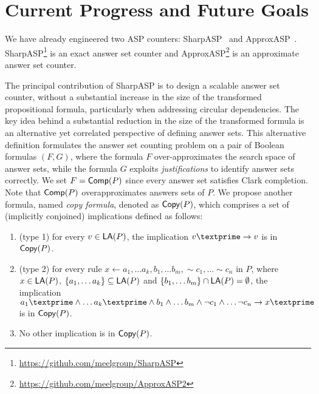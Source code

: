 \section{Current Progress and Future Goals}
We have already engineered two ASP counters: SharpASP~\cite{KCM2024} and ApproxASP~\cite{KESHFM2022}. 
SharpASP\footnote{\url{https://github.com/meelgroup/SharpASP}} is an exact answer set counter and ApproxASP\footnote{\url{https://github.com/meelgroup/ApproxASP2}} is an approximate answer set counter. 

The principal contribution of SharpASP is to design a scalable answer set counter, without a substantial increase in the size of the transformed propositional formula, particularly when addressing circular dependencies. The key idea behind a substantial reduction in the size of the transformed formula is an alternative yet correlated perspective of defining answer sets. This alternative definition formulates the answer set counting problem on a pair of Boolean formulas $(F, G)$, where the formula $F$ over-approximates the search space of answer sets, while the formula $G$ exploits {\em justifications} to identify answer sets correctly. We set $F = \mathsf{Comp}(P)$ since every answer set satisfies Clark completion. Note that $\mathsf{Comp}(P)$ overapproximates answers sets of $P$. We propose another formula, named {\em copy formula}, denoted as $\mathsf{Copy}(P)$, which comprises a set of (implicitly conjoined) implications defined as follows:
\begin{enumerate}
\item \label{l1:type1} (type 1) for every $v \in \mathsf{LA}(P)$, the implication $\copyatom{v} \rightarrow v$ is in $\mathsf{Copy}(P)$.
\item \label{l1:type2} (type 2) for every rule $x \leftarrow a_1, \ldots a_k, b_1, \ldots b_m, \sim c_1, \ldots \sim c_n$ in $P$, where
  $x \in \mathsf{LA}(P)$,
  $\{a_1, \ldots a_k\} \subseteq \mathsf{LA}(P)$ and
  $\{b_1, \ldots b_m\} \cap \mathsf{LA}(P) = \emptyset$,
  the implication $\copyatom{a_1} \wedge \ldots \copyatom{a_k} \wedge b_1 \wedge 
  \ldots b_m \wedge \neg{c_1} \wedge \ldots \neg{c_n} \rightarrow \copyatom{x}$ is in $\mathsf{Copy}(P)$.
\item No other implication is in $\mathsf{Copy}(P)$.
\end{enumerate}

